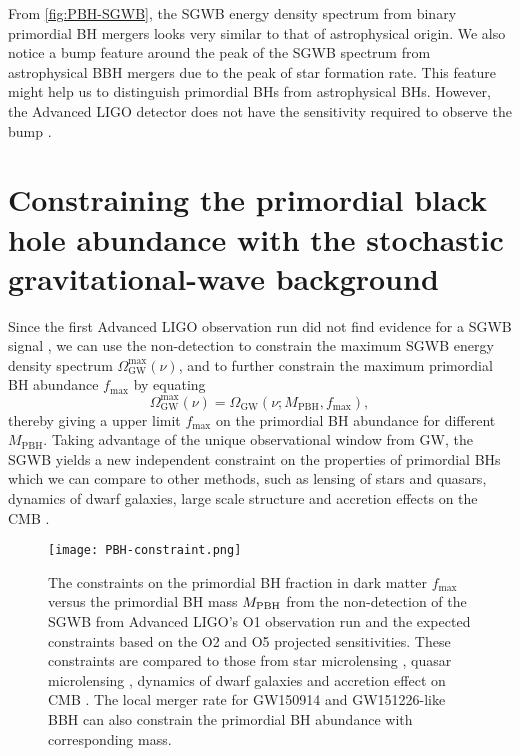 From \cref{fig:PBH-SGWB}, the \ac{SGWB} energy density spectrum from binary primordial \ac{BH} mergers looks very similar to that of astrophysical origin. 
We also notice a bump feature around the peak of the \ac{SGWB} spectrum from astrophysical \ac{BBH}
mergers due to the peak of star formation rate. 
This feature might help us to distinguish primordial \acp{BH} from astrophysical \acp{BH}.
However, the Advanced LIGO detector does not have the sensitivity required to observe the bump \cite{Callister:2016ewt}.

\section{Constraining the primordial black hole abundance with the stochastic gravitational-wave background} 
Since the first Advanced LIGO observation run did not find evidence for a \ac{SGWB} signal \cite{TheLIGOScientific:2016dpb}, we can use the non-detection to constrain the maximum \ac{SGWB} energy density spectrum $\Omega_{\textrm{GW}}^{\textrm{max}}(\nu)$, and to further constrain the maximum primordial \ac{BH} abundance $f_\textrm{max}$ by equating
\begin{equation}
\Omega_{\textrm{GW}}^{\textrm{max}}(\nu) = \Omega_{\textrm{GW}}(\nu;M_\textrm{PBH},f_\textrm{max}),
\end{equation}
thereby giving a upper limit $f_\textrm{max}$ on the primordial \ac{BH} abundance for different $M_\textrm{PBH}$. 
Taking advantage of the unique observational window from \ac{GW}, the \ac{SGWB} yields a new independent constraint on the properties of primordial \acp{BH} which we can compare to other methods, such as lensing of stars and quasars, dynamics of dwarf galaxies, large scale structure and accretion effects on the \ac{CMB} \cite{Carr:2016drx}. 

\begin{figure}[htbp]
	\centering
	\texttt{[image: PBH-constraint.png]}
	\caption{
		The constraints on the primordial \ac{BH} fraction in dark matter $f_\textrm{max}$ versus the primordial \ac{BH} mass $M_{\rm PBH}$ from the non-detection of the \ac{SGWB} from Advanced LIGO's O1 observation run and the expected constraints based on the O2 and O5 projected sensitivities.
		These constraints are compared to those from star microlensing \cite{Novati:2013fxa}, quasar microlensing \cite{Mediavilla:2009um}, dynamics of dwarf galaxies \cite{Koushiappas:2017chw} and accretion effect on \ac{CMB} \cite{Ali-Haimoud:2016mbv}.
		The local merger rate for GW150914 and GW151226-like \ac{BBH} can also constrain the primordial \ac{BH} abundance with corresponding mass. 
	}
	\label{fig:constraint}
\end{figure}

